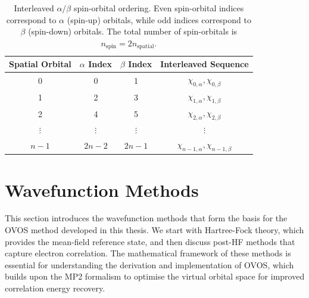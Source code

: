\begin{table}[ht]
    \centering
    \small
    \begin{tabular}{|c|c|c|c|}
        \hline
        \textbf{Spatial Orbital} & \textbf{$\alpha$ Index} & \textbf{$\beta$ Index} & \textbf{Interleaved Sequence} \\
        \hline
        0 & 0 & 1 & $\chi_{0,\alpha}, \chi_{0,\beta}$ \\
        1 & 2 & 3 & $\chi_{1,\alpha}, \chi_{1,\beta}$ \\
        2 & 4 & 5 & $\chi_{2,\alpha}, \chi_{2,\beta}$ \\
        $\vdots$ & $\vdots$ & $\vdots$ & $\vdots$ \\
        $n-1$ & $2n-2$ & $2n-1$ & $\chi_{n-1,\alpha}, \chi_{n-1,\beta}$ \\
        \hline
    \end{tabular}
    \caption{Interleaved $\alpha/\beta$ spin-orbital ordering. Even spin-orbital indices correspond to $\alpha$ (spin-up) orbitals, 
    while odd indices correspond to $\beta$ (spin-down) orbitals. The total number of spin-orbitals is $n_{\text{spin}} = 2n_{\text{spatial}}$.}
    \label{tab:spin_orbital_ordering}
\end{table}

































\section{Wavefunction Methods}
\label{sec:theory_wavefunction_methods}

This section introduces the wavefunction methods that form the basis for the OVOS method developed in this thesis. We start with Hartree-Fock theory, which provides the mean-field reference state, and then discuss post-HF methods that capture electron correlation. The mathematical framework of these methods is essential for understanding the derivation and implementation of OVOS, which builds upon the MP2 formalism to optimise the virtual orbital space for improved correlation energy recovery.

